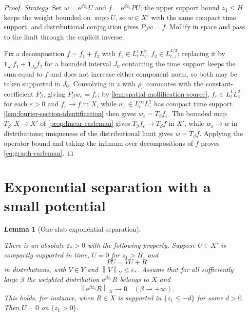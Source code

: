 \documentclass[11pt,oneside]{book}
\providecommand{\uses}[1]{}
\newtheorem{lemma}[theorem]{Lemma}
\theoremstyle{definition}
\theoremstyle{remark}
\newcommand{\1}{\mathbf 1}
\newcommand{\norm}[1]{\left\lVert #1\right\rVert}
\newcommand{\e}{\mathrm e}
\newcommand{\eps}{\varepsilon}
\begin{document}
\begin{proof}
\uses{lem:spatial-mollification-source, lem:fourier-section-identification, prop:linear-carleman}
\emph{Strategy.} Set $w=\e^{\beta z_1}U$ and $f=\e^{\beta z_1}PU$; the upper support bound
$z_1\le H$ keeps the weight bounded on $\operatorname{supp}U$, so $w\in X'$ with the same
compact time support, and distributional conjugation gives $P_\beta w=f$. Mollify in space
and pass to the limit through the explicit inverse.

Fix a decomposition $f=f_1+f_2$ with $f_1\in L^1_tL^2_z$, $f_2\in L^{4/3}_{t,z}$; replacing
it by $\1_{J_0}f_1+\1_{J_0}f_2$ for a bounded interval $J_0$ containing the time support
keeps the sum equal to $f$ and does not increase either component norm, so both may be taken
supported in $J_0$. Convolving in $z$ with $\rho_\eps$ commutes with the constant-coefficient
$P_\beta$, giving $P_\beta w_\eps=f_\eps$; by \cref{lem:spatial-mollification-source},
$f_\eps\in L^1_tL^2_z$ for each $\eps>0$ and $f_\eps\to f$ in $X$, while
$w_\eps\in L^\infty_tL^2_z$ has compact time support. \cref{lem:fourier-section-identification}
then gives $w_\eps=T_\beta f_\eps$. The bounded map $T_\beta:X\to X'$ of
\cref{prop:linear-carleman} gives $T_\beta f_\eps\to T_\beta f$ in $X'$, while $w_\eps\to w$
in distributions; uniqueness of the distributional limit gives $w=T_\beta f$. Applying the
operator bound and taking the infimum over decompositions of $f$ proves
\eqref{eq:graph-carleman}.
\end{proof}

\section{Exponential separation with a small potential}

\begin{lemma}[One-slab exponential separation]\label{lem:exponential-separation}
\uses{def:carleman-spaces, def:conjugated-operator}
There is an absolute $\eps_*>0$ with the following property. Suppose $U\in X'$ is compactly
supported in time, $U=0$ for $z_1>H$, and
\begin{equation}
 PU=VU+R \label{eq:one-slab-eq}
\end{equation}
in distributions, with $V\in Y$ and $\norm V_Y\le\eps_*$. Assume that for all sufficiently
large $\beta$ the weighted distribution $\e^{\beta z_1}R$ belongs to $X$ and
\begin{equation}
 \norm{\e^{\beta z_1}R}_X\longrightarrow0\quad(\beta\to+\infty). \label{eq:R-decay}
\end{equation}
This holds, for instance, when $R\in X$ is supported in $\{z_1\le-d\}$ for some $d>0$. Then
$U=0$ on $\{z_1>0\}$.
\end{lemma}
\end{document}
